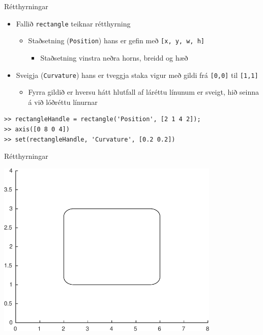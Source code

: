\documentclass[handout]{beamer}
\begin{document}
\begin{frame}[fragile]{Rétthyrningar}
\begin{itemize}
 \item Fallið \texttt{rectangle} teiknar rétthyrning
 \begin{itemize}
  \item Staðsetning (\texttt{Position}) hans er gefin með \texttt{[x, y, w, h]}
  \begin{itemize}
   \item Staðsetning vinstra neðra horns, breidd og hæð
  \end{itemize}
 \end{itemize}
 \item Sveigja (\texttt{Curvature}) hans er tveggja staka vigur með gildi frá \texttt{[0,0]} til \texttt{[1,1]}
 \begin{itemize}
  \item Fyrra gildið er hversu hátt hlutfall af láréttu línunum er sveigt, hið seinna á við lóðréttu línurnar
 \end{itemize}
\end{itemize}
\begin{verbatim}
>> rectangleHandle = rectangle('Position', [2 1 4 2]);
>> axis([0 8 0 4])
>> set(rectangleHandle, 'Curvature', [0.2 0.2])
\end{verbatim}

\end{frame}

\begin{frame}{Rétthyrningar}
\begin{center}
\includegraphics[width=0.8\textwidth]{Pics/rectangle-example}
\end{center}
\end{frame}
\end{document}
